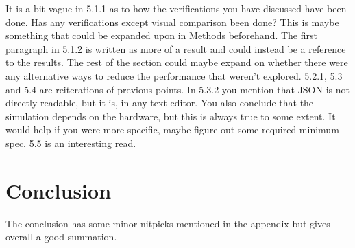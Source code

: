 \documentclass[12pt,a4paper,twoside,openright]{report}
\begin{document}
	It is a bit vague in 5.1.1 as to how the verifications you have discussed
	have been done. Has any verifications except visual comparison been done?
	This is maybe something that could be expanded upon in Methods beforehand.
	The first paragraph in 5.1.2 is written as more of a result and could
	instead be a reference to the results. The rest of the section could maybe
	expand on whether there were any alternative ways to reduce the performance
	that weren't explored.  5.2.1, 5.3 and 5.4 are reiterations of previous
	points.  In 5.3.2 you mention that JSON is not directly readable, but it
	is, in any text editor.  You also conclude that the simulation depends on
	the hardware, but this is always true to some extent. It would help if you
	were more specific, maybe figure out some required minimum spec. 5.5 is an
	interesting read.

\section*{Conclusion}

	The conclusion has some minor nitpicks mentioned in the appendix but gives
	overall a good summation.
\end{document}
